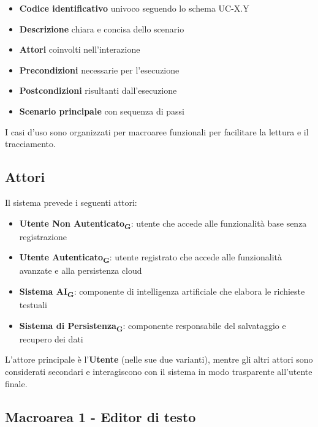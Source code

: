 \documentclass[11pt,a4paper]{article}
\begin{document}
\begin{itemize}
    \item \textbf{Codice identificativo} univoco seguendo lo schema UC-X.Y
    \item \textbf{Descrizione} chiara e concisa dello scenario
    \item \textbf{Attori} coinvolti nell'interazione
    \item \textbf{Precondizioni} necessarie per l'esecuzione
    \item \textbf{Postcondizioni} risultanti dall'esecuzione
    \item \textbf{Scenario principale} con sequenza di passi
\end{itemize}

I casi d'uso sono organizzati per macroaree funzionali per facilitare la lettura e il tracciamento.

\subsection{Attori}
Il sistema prevede i seguenti attori:

\begin{itemize}
    \item \textbf{Utente Non Autenticato\textsubscript{G}}: utente che accede alle funzionalità base senza registrazione
    \item \textbf{Utente Autenticato\textsubscript{G}}: utente registrato che accede alle funzionalità avanzate e alla persistenza cloud
    \item \textbf{Sistema AI\textsubscript{G}}: componente di intelligenza artificiale che elabora le richieste testuali
    \item \textbf{Sistema di Persistenza\textsubscript{G}}: componente responsabile del salvataggio e recupero dei dati
\end{itemize}

L'attore principale è l'\textbf{Utente} (nelle sue due varianti), mentre gli altri attori sono considerati secondari e interagiscono con il sistema in modo trasparente all'utente finale.

\newpage

\subsection{Macroarea 1 - Editor di testo}
\end{document}
